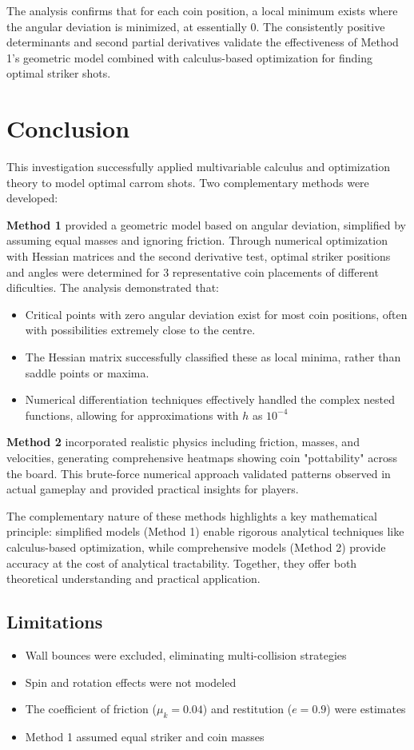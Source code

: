 \documentclass[10pt]{article}
\begin{document}
The analysis confirms that for each coin position, a local minimum exists where the angular deviation is minimized, at essentially 0. The consistently positive determinants and second partial derivatives validate the effectiveness of Method 1's geometric model combined with calculus-based optimization for finding optimal striker shots.

\section{Conclusion}

This investigation successfully applied multivariable calculus and optimization theory to model optimal carrom shots. Two complementary methods were developed:

\textbf{Method 1} provided a geometric model based on angular deviation, simplified by assuming equal masses and ignoring friction. Through numerical optimization with Hessian matrices and the second derivative test, optimal striker positions and angles were determined for 3 representative coin placements of different dificulties. The analysis demonstrated that:
\begin{itemize}
    \item Critical points with zero angular deviation exist for most coin positions, often with possibilities extremely close to the centre. 
    \item The Hessian matrix successfully classified these as local minima, rather than saddle points or maxima.
    \item Numerical differentiation techniques effectively handled the complex nested functions, allowing for approximations with $h$ as $10^{-4}$
\end{itemize}

\textbf{Method 2} incorporated realistic physics including friction, masses, and velocities, generating comprehensive heatmaps showing coin "pottability" across the board. This brute-force numerical approach validated patterns observed in actual gameplay and provided practical insights for players.

The complementary nature of these methods highlights a key mathematical principle: simplified models (Method 1) enable rigorous analytical techniques like calculus-based optimization, while comprehensive models (Method 2) provide accuracy at the cost of analytical tractability. Together, they offer both theoretical understanding and practical application.

\subsection{Limitations}
\begin{itemize}
    \item Wall bounces were excluded, eliminating multi-collision strategies
    \item Spin and rotation effects were not modeled
    \item The coefficient of friction ($\mu_k = 0.04$) and restitution ($e = 0.9$) were estimates
    \item Method 1 assumed equal striker and coin masses
\end{itemize}
\end{document}

